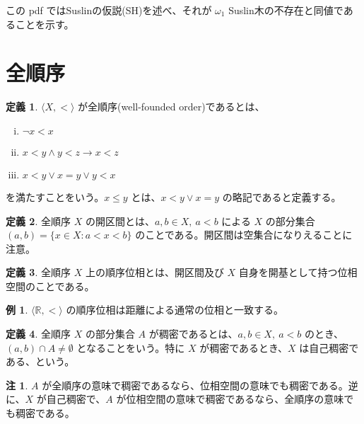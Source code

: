 \documentclass{jsarticle}
\theoremstyle{definition}
\newtheorem*{definition*}{定義}
\newtheorem{remark}{注}[section]
\newtheorem{example}{例}[section]
\begin{document}
    この pdf ではSuslinの仮説(SH)を述べ、それが $\omega_1$ Suslin木の不存在と同値であることを示す。
    \section{全順序}
    \begin{definition*} \label{total_order}
        $\langle X, < \rangle$ が全順序(well-founded order)であるとは、
        \begin{enumerate}[(i)]
            \item $\lnot x < x$
            \item $x < y \land y < z \rightarrow x < z$
            \item $x < y \lor x = y \lor y < x$
        \end{enumerate}
        を満たすことをいう。$x \leq y$ とは、$x < y \lor x = y$ の略記であると定義する。
    \end{definition*}
    
    \vspace{0.5ex}
    
    \begin{definition*} \label{open_interval}
        全順序 $X$ の開区間とは、$a, b \in X, \ a < b$ による $X$ の部分集合 $(a, b) = \{x \in X : a < x < b\}$ のことである。開区間は空集合になりえることに注意。
    \end{definition*}
    
    \begin{definition*} \label{order_topology}
        全順序 $X$ 上の順序位相とは、開区間及び $X$ 自身を開基として持つ位相空間のことである。
    \end{definition*}
    
    \begin{example}
        $\langle \mathbb{R}, < \rangle$ の順序位相は距離による通常の位相と一致する。
    \end{example}
    
    \vspace{0.5ex}
    
    \begin{definition*}  全順序 $X$ の部分集合 $A$ が稠密であるとは、$a, b \in X, \ a < b$ のとき、$(a,b) \cap A \neq \emptyset$ となることをいう。特に $X$ が稠密であるとき、$X$ は自己稠密である、という。
    \end{definition*}
    
    \begin{remark}
        $A$ が全順序の意味で稠密であるなら、位相空間の意味でも稠密である。逆に、$X$ が自己稠密で、$A$ が位相空間の意味で稠密であるなら、全順序の意味でも稠密である。
    \end{remark}
    
\end{document}
